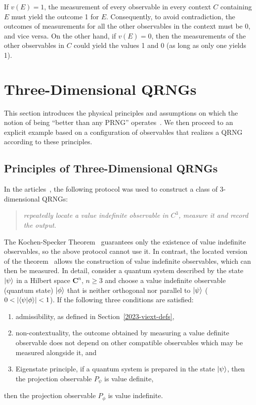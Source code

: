 \documentclass[%
 superscriptaddress,
  preprint,
 showpacs,
 showkeys,
 nofootinbib,
  amsmath,amssymb,
 pra,
  longbibliography,
  floatfix,
 ]{revtex4-2}
\theoremstyle{definition}
\begin{document}
If $v(E)=1$, the measurement of every observable in
every
context $C$ containing $E$ must yield the outcome 1 for $E$.
Consequently, to avoid contradiction, the outcomes of measurements for all the other observables in the context must be 0, and vice versa.  On the other hand, if $v(E)=0$,
then the measurements of the other observables in $C$ could yield the values 1 and 0 (as long as only one yields 1).


\section{Three-Dimensional QRNGs}

This section introduces the physical principles and assumptions on which the notion of being ``better than any PRNG'' operates~\cite{2012-incomput-proofsCJ,aguero_trejo_new_2021,RSPA23}.
We then proceed to an explicit example based on a configuration of observables that realizes a QRNG according to these principles.


\subsection{Principles of Three-Dimensional QRNGs}


In the articles~\cite{2008-cal-svo,2012-incomput-proofsCJ,2015-AnalyticKS}, the following protocol was used to construct a class of  3-dimensional QRNGs:
\begin{quote} {\it repeatedly locate a value indefinite observable in $C^3$, measure it and record the output}.
\end{quote}
 The Kochen-Specker Theorem~\cite{kochen1} guarantees only the existence of value indefinite
observables, so the above protocol cannot use it. In contrast, the located version of the theorem~\cite{2008-cal-svo,2012-incomput-proofsCJ} allows the construction of value indefinite observables, which can then be measured. In detail, consider a quantum system
 described by the state
$\ket{\psi}$ in a Hilbert space ${\mathbf C}^n$, $n\ge 3$ and choose  a value indefinite observable (quantum state) $\ket{\phi}$ that is neither orthogonal nor parallel to $\ket{\psi}$ {\rm ($0<\abs{\bra{\psi}\ket{\phi}}<1$)}. If the following three conditions are satisfied:

\begin{enumerate}
\item  admissibility, as defined in Section~\ref{2023-viext-defs}, \item non-contextuality,
the outcome obtained by
measuring a value definite observable
  does not
depend on other compatible
 observables which may be measured alongside it, and \item
Eigenstate principle, if a quantum system is prepared in the
state $\ket{\psi}$,
then the projection observable
$P_\psi$ is value definite,
\end{enumerate}
then the projection observable $P_\phi$ is value indefinite.
\end{document}
